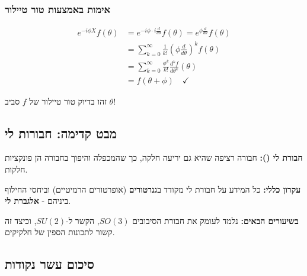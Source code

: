 \subsubsection{אימות באמצעות טור טיילור}

\begin{align*}
e^{-i\phi X} f(\theta) &= e^{-i\phi \cdot i\frac{d}{d\theta}} f(\theta) = e^{\phi \frac{d}{d\theta}} f(\theta) \\
&= \sum_{k=0}^\infty \frac{1}{k!} \left(\phi \frac{d}{d\theta}\right)^k f(\theta) \\
&= \sum_{k=0}^\infty \frac{\phi^k}{k!} \frac{d^k f}{d\theta^k}(\theta) \\
&= f(\theta + \phi) \quad \checkmark
\end{align*}

זהו בדיוק טור טיילור של $f$ סביב $\theta$!

\subsection{מבט קדימה: חבורות לי}

\begin{notebox}
\textbf{חבורת לי ():} חבורה רציפה שהיא גם יריעה חלקה, כך שהמכפלה והיפוך בחבורה הן פונקציות חלקות.

\textbf{עקרון כללי:} כל המידע על חבורת לי מקודד ב\textbf{גנרטורים} (אופרטורים הרמיטיים) וביחסי החילוף ביניהם - \textbf{אלגברת לי}.

\textbf{בשיעורים הבאים:} נלמד לעומק את חבורת הסיבובים $SO(3)$, הקשר ל-$SU(2)$, וכיצד זה קשור לתכונות הספין של חלקיקים.
\end{notebox}

\subsection{סיכום עשר נקודות}

